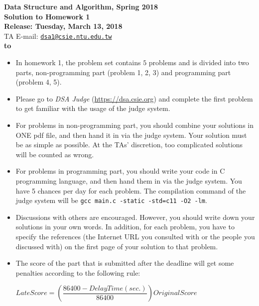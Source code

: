 \documentclass[12pt,a4paper]{report}
\theoremstyle{definition}
\theoremstyle{definition}
\def\headline#1{\hbox to \hsize{\hrulefill\quad\lower.3em\hbox{#1}\quad\hrulefill}}
\def\headline#1{\hbox to \hsize{\hrulefill\quad\lower.3em\hbox{#1}\quad\hrulefill}}
\begin{document}
\begin{center}
\textbf{\Large Data Structure and Algorithm, Spring 2018\\}
\textbf{\Large Solution to Homework 1\\} 
\vspace{5pt}
\textbf{Release: Tuesday, March 13, 2018}\\
TA E-mail: \href{mailto:dsa1@csie.ntu.edu.tw}{\texttt{dsa1@csie.ntu.edu.tw}}\\
\vspace{5pt}
\textbf{\headline{Rules and Instructions}}
\begin{itemize}
    \item In homework 1, the problem set contains $5$ problems and is divided into two parts, non-programming part (problem 1, 2, 3)  and programming part (problem 4, 5). 
    \item Please go to \textit{DSA Judge} (\url{https://dsa.csie.org}) and complete the first problem to get familiar with the usage of the judge system.
    \item For problems in non-programming part, you should combine your solutions in ONE pdf file, and then hand it in via the judge system. Your solution must be as simple as possible. At the TAs' discretion, too complicated solutions will be counted as wrong.
    \item For problems in programming part, you should write your code in C programming language, and then hand them in via the judge system. You have 5 chances per day for each problem. The compilation command of the judge system will be \texttt{gcc main.c -static -std=c11 -O2 -lm}.
    \item Discussions with others are encouraged. However, you should write down your solutions in your own words. In addition, for each problem, you have to specify the references (the Internet URL you consulted with or the people you discussed with) on the first page of your solution to that problem.
    \item The score of the part that is submitted after the deadline will get some penalties according to the following rule:
    \begin{center}
        $LateScore = (\dfrac{86400-DelayTime (sec.)}{86400})OriginalScore$
    \end{center}

\end{itemize}

\end{center}
\newpage
\end{document}
